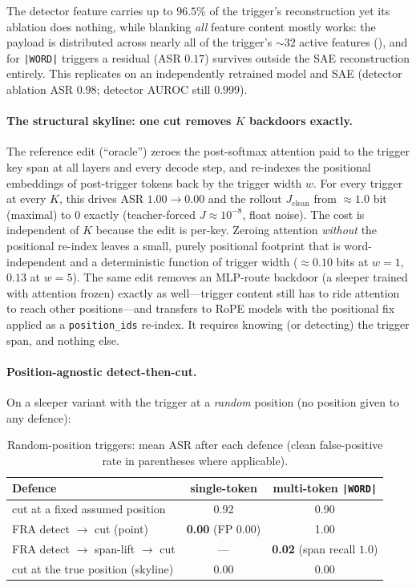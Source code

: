 \documentclass{article}
\theoremstyle{plain}
\theoremstyle{definition}
\theoremstyle{remark}
\begin{document}
The detector feature carries up to $96.5\%$ of the trigger's reconstruction yet its ablation does nothing, while blanking \emph{all} feature content mostly works: the payload is distributed across nearly all of the trigger's ${\sim}32$ active features (), and for \texttt{|WORD|} triggers a residual (ASR $0.17$) survives outside the SAE reconstruction entirely. This replicates on an independently retrained model and SAE (detector ablation ASR $0.98$; detector AUROC still $0.999$).

\paragraph{The structural skyline: one cut removes $K$ backdoors exactly.} The reference edit (``oracle'') zeroes the post-softmax attention paid to the trigger key span at all layers and every decode step, and re-indexes the positional embeddings of post-trigger tokens back by the trigger width $w$. For every trigger at every $K$, this drives ASR $1.00 \to 0.00$ and the rollout $J_{\text{clean}}$ from ${\approx}1.0$ bit (maximal) to $0$ exactly (teacher-forced $J \approx 10^{-8}$, float noise). The cost is independent of $K$ because the edit is per-key. Zeroing attention \emph{without} the positional re-index leaves a small, purely positional footprint that is word-independent and a deterministic function of trigger width ($\approx 0.10$ bits at $w{=}1$, $0.13$ at $w{=}5$). The same edit removes an MLP-route backdoor (a sleeper trained with attention frozen) exactly as well---trigger content still has to ride attention to reach other positions---and transfers to RoPE models with the positional fix applied as a \texttt{position\_ids} re-index. It requires knowing (or detecting) the trigger span, and nothing else.

\paragraph{Position-agnostic detect-then-cut.} On a sleeper variant with the trigger at a \emph{random} position (no position given to any defence):

\begin{table}[h]
\caption{Random-position triggers: mean ASR after each defence (clean false-positive rate in parentheses where applicable).}
\label{tab:posagnostic}
\centering
\small
\begin{tabular}{lcc}
\toprule
Defence & single-token & multi-token \texttt{|WORD|} \\
\midrule
cut at a fixed assumed position & 0.92 & 0.90 \\
FRA detect $\to$ cut (point) & \textbf{0.00} (FP $0.00$) & 1.00 \\
FRA detect $\to$ span-lift $\to$ cut & --- & \textbf{0.02} (span recall $1.0$) \\
cut at the true position (skyline) & 0.00 & 0.00 \\
\bottomrule
\end{tabular}
\end{table}
\end{document}
